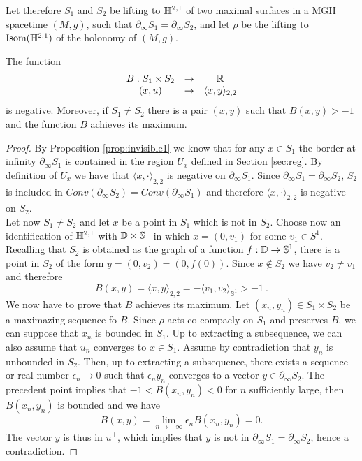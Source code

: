 Let therefore $S_1$ and $S_2$ be lifting to $\mathbb{H}^{2,1}$ of two maximal surfaces in a MGH spacetime $(M,g)$, such that $\partial_\infty S_1 = \partial_\infty S_2$, and let $\rho$ be the lifting to $\text{Isom}(\mathbb{H}^{2,1})$ of the holonomy of $(M,g)$. 
\begin{lemma}\label{lem:maxgen}
    The function 
    \[
    \begin{array}{ccc}
        B: S_1 \times S_2 & \to & \mathbb{R} \\
        (x,u) & \to & \langle x,y \rangle_{2,2}
    \end{array}
    \]
    is negative. Moreover, if $S_1 \neq S_2$ there is a pair $(x,y)$ such that $B(x,y) > -1$ and the function $B$ achieves its maximum.
\end{lemma}
\begin{proof}
    By Proposition \ref{prop:invisible1} we know that for any $x\in S_1$ the border at infinity $\partial_\infty  S_1$ is contained in the region $U_x$ defined in Section \ref{sec:reg}. By definition of $U_x$ we have that $\langle x, \cdot \rangle_{2,2}$ is negative on $\partial_\infty S_1$. Since $\partial_\infty S_1 = \partial_\infty S_2$, $S_2$ is included in $Conv(\partial_\infty S_2)= Conv(\partial_\infty S_1)$ and therefore $\langle x, \cdot \rangle_{2,2}$ is negative on $S_2$.\\
    Let now $S_1 \neq S_2$ and let $x$ be a point in $S_1$ which is not in $S_2$. Choose now an identification of $\mathbb{H}^{2,1}$ with $\mathbb{D} \times \mathbb{S}^1$ in which $x = (0,v_1)$ for some $v_1 \in S^1$. Recalling that $S_2$ is obtained as the graph of a function $f:\mathbb{D} \to \mathbb{S}^1$, there is a point in $S_2$ of the form $y=(0,v_2) = (0, f(0))$. Since $x\notin S_2$ we have $v_2 \neq v_1$ and therefore
    \[
        B(x,y)= \langle x,y \rangle _{2,2} = - \langle v_1, v_2 \rangle _{\mathbb{S}^1} > -1 \ .
    \]
    We now have to prove that $B$ achieves its maximum. Let $(x_n, y_n) \in S_1 \times S_2$  be a maximazing sequence fo $B$. Since $\rho$ acts co-compacly on $S_1$ and preserves $B$, we can suppose that $x_n$ is bounded in $S_1$. Up to extracting a subsequence, we can also assume that $u_n$ converges to $x\in S_1$. Assume by contradiction that $y_n$ is unbounded in $S_2$. Then, up to extracting a subsequence, there exists a sequence or real number $\epsilon_n \to 0$ such that $\epsilon_n y_n$ converges to a vector $y\in \partial_\infty S_2$. The precedent point implies that $-1 < B(x_n, y_n) < 0$ for $n$ sufficiently large, then $B(x_n, y_n)$ is bounded and we have
    \[
        B(x,y) = \lim_{n\to +\infty} \epsilon_n B(x_n,y_n) = 0 .
    \]
    The vector $y$ is thus in $u^\perp$, which implies that $y$ is not in $\partial_\infty S_1 = \partial_\infty S_2$, hence a contradiction.
\end{proof}
